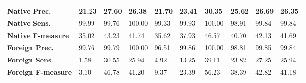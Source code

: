 \begin{table}[htp]
{\begin{tabular}{l|l|l|l|l|l|l|l|l|l|}
		\multicolumn{1}{|l|}{\textbf{Native Prec.}}          & 21.23 & 27.60        & 26.38       & 21.70         & 23.41         & 30.35       & 25.62          & 26.69         & 26.35        \\ \hline
		\multicolumn{1}{|l|}{\textbf{Native Sens.}}        & 99.99 & 99.76        & 100.00      & 99.33         & 99.93         & 100.00      & 98.91          & 99.84         & 99.84        \\ \hline
		\multicolumn{1}{|l|}{\textbf{Native F-measure}}          & 35.02 & 43.23        & 41.74       & 35.62         & 37.93         & 46.57       & 40.70          & 42.13         & 41.69        \\ \hline
		\multicolumn{1}{|l|}{\textbf{Foreign Prec.}}         & 99.76 & 99.79        & 100.00      & 96.51         & 99.86         & 100.00      & 98.81          & 99.85         & 99.84        \\ \hline
		\multicolumn{1}{|l|}{\textbf{Foreign Sens.}}       & 1.58 & 30.55        & 25.94       & 4.92          & 13.25         & 39.11       & 23.82          & 27.25         & 25.94        \\ \hline
		\multicolumn{1}{|l|}{\textbf{Foreign F-measure}}         & 3.10  & 46.78        & 41.20       & 9.37          & 23.39         & 56.23       & 38.39          & 42.82         & 41.18        \\ \hline
	\end{tabular}
	}
\end{table}

